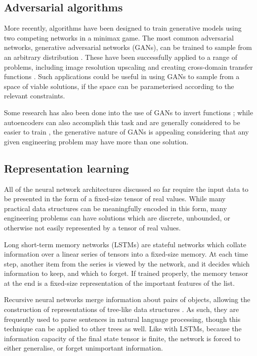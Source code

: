 \documentclass[a4paper]{article}
\begin{document}
\subsection{Adversarial algorithms}

More recently, algorithms have been designed to train generative models using two competing networks in a minimax game.
The most common adversarial networks, generative adversarial networks (GANs), can be trained to sample from an arbitrary distribution \cite{goodfellow14, horger18}.
These have been successfully applied to a range of problems, including image resolution upscaling \cite{ledig17} and creating cross-domain transfer functions \cite{zhu18}.
Such applications could be useful in using GANs to sample from a space of viable solutions, if the space can be parameterised according to the relevant constraints.

Some research has also been done into the use of GANs to invert functions \cite{anirudh18};
while autoencoders can also accomplish this task and are generally considered to be easier to train \cite{bang18},
the generative nature of GANs is appealing considering that any given engineering problem may have more than one solution.

\subsection{Representation learning}

All of the neural network architectures discussed so far require the input data to be presented in the form of a fixed-size tensor of real values.
While many practical data structures can be meaningfully encoded in this form, many engineering problems can have solutions which are discrete,
unbounded, or otherwise not easily represented by a tensor of real values.

Long short-term memory networks (LSTMs) \cite{hochreiter97} are stateful networks which collate information over a linear series of tensors into a fixed-size memory.
At each time step, another item from the series is viewed by the network, and it decides which information to keep, and which to forget.
If trained properly, the memory tensor at the end is a fixed-size representation of the important features of the list.

Recursive neural networks merge information about pairs of objects, allowing the construction of representations of tree-like data structures \cite{socher11}.
As such, they are frequently used to parse sentences in natural language processing, though this technique can be applied to other trees as well.
Like with LSTMs, because the information capacity of the final state tensor is finite, the network is forced to either generalise, or forget unimportant information.
\end{document}
